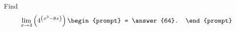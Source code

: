 \documentclass{ximera}
\author{Gregory Hartman \and Matthew Carr}
\begin{document}
\begin{exercise}




Find 
\[
\lim_{x\to3}\p{4^{\p{x^3-8x}}}
\begin{prompt}
= \answer{64}.
\end{prompt}
\]

\end{exercise}
\end{document}
